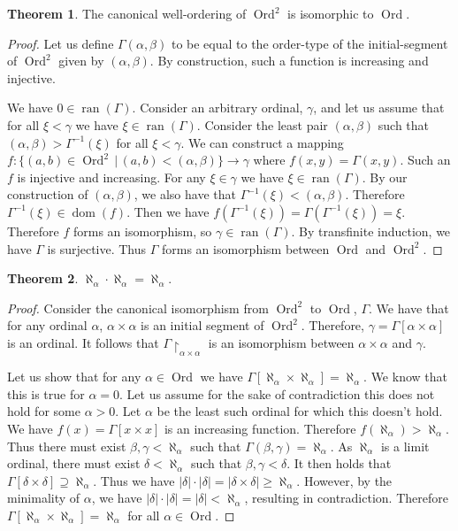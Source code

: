\documentclass{article}
\theoremstyle{definition}
\newtheorem{thm}{Theorem}[section]
\DeclareMathOperator{\ran}{ran}
\DeclareMathOperator{\dom}{dom}
\DeclareMathOperator{\Ord}{Ord}
\newcommand{\abs}[1]{\lvert#1\rvert}
\begin{document}
\begin{thm}
    The canonical well-ordering of $\Ord^2$ is isomorphic to $\Ord$.
\end{thm}

\begin{proof}
    Let us define $\Gamma(\alpha, \beta)$ to be equal to the order-type of the initial-segment of $\Ord^2$ given by $(\alpha, \beta)$. By construction, such a function is increasing and injective. 
    
    We have $0 \in \ran(\Gamma)$. Consider an arbitrary ordinal, $\gamma$, and let us assume that for all $\xi < \gamma$ we have $\xi \in \ran(\Gamma)$. Consider the least pair $(\alpha, \beta)$ such that $(\alpha, \beta) > \Gamma^{-1}(\xi)$ for all $\xi < \gamma$. We can construct a mapping $f: \{(a, b) \in \Ord^2 \, | \, (a, b) < (\alpha, \beta) \} \to \gamma$ where $f(x, y) = \Gamma(x, y)$. Such an $f$ is injective and increasing. For any $\xi \in \gamma$ we have $\xi \in \ran(\Gamma)$. By our construction of $(\alpha, \beta)$, we also have that $\Gamma^{-1}(\xi) < (\alpha, \beta)$. Therefore $\Gamma^{-1}(\xi) \in \dom(f)$. Then we have $f(\Gamma^{-1}(\xi)) = \Gamma(\Gamma^{-1}(\xi)) = \xi$. Therefore $f$ forms an isomorphism, so $\gamma \in \ran(\Gamma)$. By transfinite induction, we have $\Gamma$ is surjective. Thus $\Gamma$ forms an isomorphism between $\Ord$ and $\Ord^2$.
\end{proof}

\begin{thm}
    $\aleph_\alpha \cdot \aleph_\alpha = \aleph_\alpha$.
\end{thm}

\begin{proof}
    Consider the canonical isomorphism from $\Ord^2$ to $\Ord$, $\Gamma$. We have that for any ordinal $\alpha$, $\alpha \times \alpha$ is an initial segment of $\Ord^2$. Therefore, $\gamma = \Gamma[\alpha \times \alpha]$ is an ordinal. It follows that $\Gamma \restriction_{\alpha \times \alpha}$ is an isomorphism between $\alpha \times \alpha$ and $\gamma$.
    
    Let us show that for any $\alpha \in \Ord$ we have $\Gamma[\aleph_\alpha \times \aleph_\alpha] = \aleph_\alpha$. We know that this is true for $\alpha = 0$. Let us assume for the sake of contradiction this does not hold for some $\alpha > 0$. Let $\alpha$ be the least such ordinal for which this doesn't hold. We have $f(x) = \Gamma[x \times x]$ is an increasing function. Therefore $f(\aleph_\alpha) > \aleph_\alpha$. Thus there must exist $\beta, \gamma < \aleph_\alpha$ such that $\Gamma(\beta, \gamma) = \aleph_\alpha$. As $\aleph_\alpha$ is a limit ordinal, there must exist $\delta < \aleph_\alpha$ such that $\beta, \gamma < \delta$. It then holds that $\Gamma[\delta \times \delta] \supseteq \aleph_\alpha$. Thus we have $\abs{\delta} \cdot \abs{\delta} = \abs{\delta \times \delta} \ge \aleph_\alpha$. However, by the minimality of $\alpha$, we have $\abs{\delta} \cdot \abs{\delta} = \abs{\delta} < \aleph_\alpha$, resulting in contradiction. Therefore $\Gamma[\aleph_\alpha \times \aleph_\alpha] = \aleph_\alpha$ for all $\alpha \in \Ord$.
\end{proof}
\end{document}
